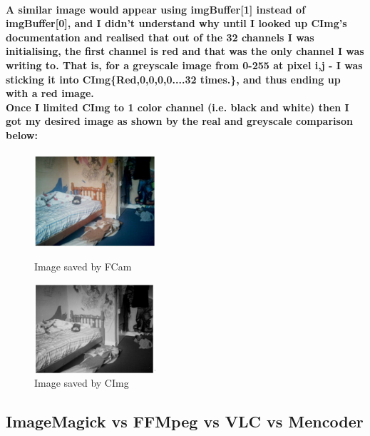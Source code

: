 \paragraph{
A similar image would appear using imgBuffer[1] instead of imgBuffer[0], and I didn't understand why until I looked up CImg's documentation and realised that out of the 32 channels I was initialising, the first channel is red and that was the only channel I was writing to.
That is, for a greyscale image from 0-255 at pixel i,j - I was sticking it into CImg\{Red,0,0,0,0....32 times.\}, and thus ending up with a red image.
\\Once I limited CImg to 1 color channel (i.e. black and white) then I got my desired image as shown by the real and greyscale comparison below:
}
\begin{figure}
	\vspace{-20pt}
	\begin{center}
		\includegraphics[width=0.4\textwidth]{../images/realbuffer2}
	\end{center}
	\vspace{-20pt}
	\caption{Image saved by FCam}
	\vspace{0pt}
	\begin{center}
		\includegraphics[width=0.4\textwidth]{../images/blackbuffer3}
	\end{center}
	\vspace{-20pt}
	\caption{Image saved by CImg}
	\vspace{-40pt}
\end{figure}

\subsection{ImageMagick vs FFMpeg vs VLC vs Mencoder}
